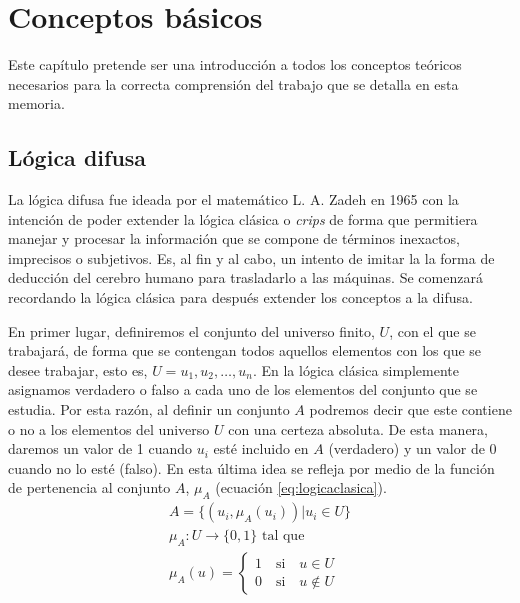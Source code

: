 \chapter{Conceptos básicos}\label{preliminares}\label{basicos}

Este capítulo pretende ser una introducción a todos los conceptos teóricos necesarios para la correcta comprensión del trabajo que se detalla en esta memoria. 

\section{Lógica difusa}\label{sec:logicadifusa}
La lógica difusa fue ideada por el matemático L. A. Zadeh \cite{art:zadeh} en 1965 con la intención de poder extender la lógica clásica o {\em crips} de forma que permitiera manejar y procesar la información que se compone de términos inexactos, imprecisos o subjetivos. Es, al fin y al cabo, un intento de imitar la la forma de deducción del cerebro humano para trasladarlo a las máquinas. Se comenzará recordando la lógica clásica para después extender los conceptos a la difusa.

En primer lugar, definiremos el conjunto del universo finito, $U$,  con el que se  trabajará, de forma que se contengan todos aquellos elementos con los que se desee trabajar, esto es, $U = {u_{1}, u_{2}, \dots, u_{n}}$. En la lógica clásica simplemente asignamos verdadero o falso a cada uno de los elementos del conjunto que se estudia. Por esta razón, al definir un conjunto $A$ podremos decir que este contiene o no a los elementos del universo $U$ con una certeza absoluta. De esta manera, daremos un valor de 1 cuando $u_{i}$ esté incluido en $A$ (verdadero) y un valor de 0 cuando no lo esté (falso). En esta última idea se refleja por medio de la función de pertenencia al conjunto  $A$, $\mu_{A}$ (ecuación \ref{eq:logicaclasica}).
\begin{equation}\label{eq:logicaclasica}
\begin{aligned} 
	A = \{(u_{i}, \mu_{A}(u_{i})) | u_{i}\in U\}\\
	\mu_{A}:U\rightarrow \{0,1\} \text{ tal que}\\
	\mu_{A}(u) = \left\{ \begin{aligned}
		1 \quad\text{si}\quad u\in U\\
		0 \quad\text{si}\quad u\notin U
 	\end{aligned}\right.
\end{aligned}
\end{equation}

